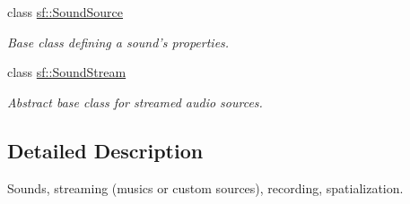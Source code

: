 \begin{DoxyCompactItemize}
class \hyperlink{classsf_1_1_sound_source}{sf\+::\+Sound\+Source}
\begin{DoxyCompactList}\small\item\em Base class defining a sound's properties. \end{DoxyCompactList}\item 
class \hyperlink{classsf_1_1_sound_stream}{sf\+::\+Sound\+Stream}
\begin{DoxyCompactList}\small\item\em Abstract base class for streamed audio sources. \end{DoxyCompactList}\end{DoxyCompactItemize}


\subsection{Detailed Description}
Sounds, streaming (musics or custom sources), recording, spatialization. 